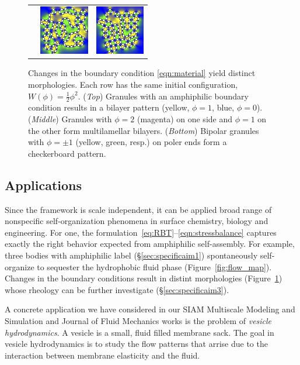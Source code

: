 \begin{figure}
\begin{center}
\begin{tabular}{m{0.9in}m{0.9in}m{0.9in}}
      &\includegraphics[width=0.85in]{figures/SpecificAim1/N100A2.jpg}
      &\includegraphics[width=0.85in]{figures/SpecificAim1/N100A3.jpg} 
  \end{tabular}
  \end{center}
  \vspace{-15pt}
  \caption{\footnotesize \label{fig:self-assembly2}
  Changes in the boundary condition \eqref{eqn:material}
  yield distinct morphologies.
  Each row has the same initial configuration, $W(\phi) = \tfrac{1}{2}\phi^2$.
  (\emph{Top}) Granules with an amphiphilic boundary condition
  results in a bilayer pattern (yellow,
  $\phi = 1$, blue, $\phi = 0$).
  (\emph{Middle}) Granules with $\phi = 2$ (magenta) on one side and $\phi = 1$
  on the other   form multilamellar bilayers.
  (\emph{Bottom}) Bipolar granules with $\phi = \pm 1$ (yellow, green, resp.)
  on poler ends   form a checkerboard pattern.}
\end{figure}
\subsection{Applications}
Since the framework is scale independent, it can be applied broad
range of nonspecific self-organization phenomena in surface chemistry,
biology and engineering. For one, the
formulation~\eqref{eq:RBT}--\eqref{eqn:stressbalance} captures exactly
the right behavior expected from amphiphilic self-assembly.
For example, three bodies with amphiphilic label (\S\ref{sec:specificaim1})
spontaneously self-organize to sequester the hydrophobic fluid phase
(Figure~\ref{fig:flow_map}).
Changes in the boundary conditions result in
distint morphologies
(Figure~\ref{fig:self-assembly2})
whose rheology can be further investigate (\S\ref{sec:specificaim3}).

A concrete application we have considered in our
SIAM Multiscale Modeling and Simulation and Journal of Fluid Mechanics works
\cite{Fu2018_SIAM, FuQuRyYo22}
is the problem of \emph{vesicle hydrodynamics}.
A vesicle is a small, fluid filled membrane sack.
The goal in vesicle hydrodynamics is to study the flow patterns 
that arrise due to the interaction
between membrane elasticity and the fluid.

